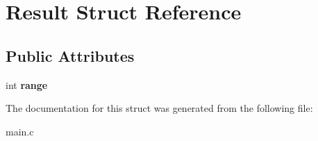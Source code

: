 \hypertarget{struct_result}{}\section{Result Struct Reference}
\label{struct_result}
\subsection*{Public Attributes}
\begin{DoxyCompactItemize}
\item 
\hypertarget{struct_result_a7e3026a0aaa6ed0470876dbc2a0dffee}{}int {\bfseries range}\label{struct_result_a7e3026a0aaa6ed0470876dbc2a0dffee}

\end{DoxyCompactItemize}


The documentation for this struct was generated from the following file\+:\begin{DoxyCompactItemize}
\item 
main.\+c\end{DoxyCompactItemize}
